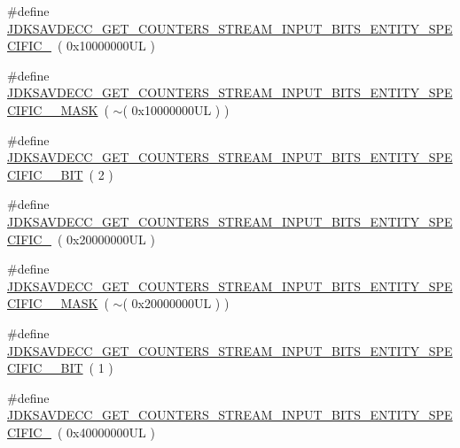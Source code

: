\begin{DoxyCompactItemize}
\item 
\#define \hyperlink{group__get__counters__stream__input__bits_ga68d42da28ac11a7fd256b3d3926f728a}{J\+D\+K\+S\+A\+V\+D\+E\+C\+C\+\_\+\+G\+E\+T\+\_\+\+C\+O\+U\+N\+T\+E\+R\+S\+\_\+\+S\+T\+R\+E\+A\+M\+\_\+\+I\+N\+P\+U\+T\+\_\+\+B\+I\+T\+S\+\_\+\+E\+N\+T\+I\+T\+Y\+\_\+\+S\+P\+E\+C\+I\+F\+I\+C\+\_}~( 0x10000000\+U\+L )
\item 
\#define \hyperlink{group__get__counters__stream__input__bits_gafd41765ad19a55a22f8d0fd66548c28a}{J\+D\+K\+S\+A\+V\+D\+E\+C\+C\+\_\+\+G\+E\+T\+\_\+\+C\+O\+U\+N\+T\+E\+R\+S\+\_\+\+S\+T\+R\+E\+A\+M\+\_\+\+I\+N\+P\+U\+T\+\_\+\+B\+I\+T\+S\+\_\+\+E\+N\+T\+I\+T\+Y\+\_\+\+S\+P\+E\+C\+I\+F\+I\+C\+\_\+\_\+\+M\+A\+SK}~( $\sim$( 0x10000000\+U\+L ) )
\item 
\#define \hyperlink{group__get__counters__stream__input__bits_gaa33fa96737b3830f87c6b1f8ec40be97}{J\+D\+K\+S\+A\+V\+D\+E\+C\+C\+\_\+\+G\+E\+T\+\_\+\+C\+O\+U\+N\+T\+E\+R\+S\+\_\+\+S\+T\+R\+E\+A\+M\+\_\+\+I\+N\+P\+U\+T\+\_\+\+B\+I\+T\+S\+\_\+\+E\+N\+T\+I\+T\+Y\+\_\+\+S\+P\+E\+C\+I\+F\+I\+C\+\_\+\_\+\+B\+IT}~( 2 )
\item 
\#define \hyperlink{group__get__counters__stream__input__bits_ga0891e83444d48357429c7c9b32c61460}{J\+D\+K\+S\+A\+V\+D\+E\+C\+C\+\_\+\+G\+E\+T\+\_\+\+C\+O\+U\+N\+T\+E\+R\+S\+\_\+\+S\+T\+R\+E\+A\+M\+\_\+\+I\+N\+P\+U\+T\+\_\+\+B\+I\+T\+S\+\_\+\+E\+N\+T\+I\+T\+Y\+\_\+\+S\+P\+E\+C\+I\+F\+I\+C\+\_}~( 0x20000000\+U\+L )
\item 
\#define \hyperlink{group__get__counters__stream__input__bits_ga5238c521ad024f330f93c21ce47cf344}{J\+D\+K\+S\+A\+V\+D\+E\+C\+C\+\_\+\+G\+E\+T\+\_\+\+C\+O\+U\+N\+T\+E\+R\+S\+\_\+\+S\+T\+R\+E\+A\+M\+\_\+\+I\+N\+P\+U\+T\+\_\+\+B\+I\+T\+S\+\_\+\+E\+N\+T\+I\+T\+Y\+\_\+\+S\+P\+E\+C\+I\+F\+I\+C\+\_\+\_\+\+M\+A\+SK}~( $\sim$( 0x20000000\+U\+L ) )
\item 
\#define \hyperlink{group__get__counters__stream__input__bits_gac776215970253e9bde2bf05d38b08021}{J\+D\+K\+S\+A\+V\+D\+E\+C\+C\+\_\+\+G\+E\+T\+\_\+\+C\+O\+U\+N\+T\+E\+R\+S\+\_\+\+S\+T\+R\+E\+A\+M\+\_\+\+I\+N\+P\+U\+T\+\_\+\+B\+I\+T\+S\+\_\+\+E\+N\+T\+I\+T\+Y\+\_\+\+S\+P\+E\+C\+I\+F\+I\+C\+\_\+\_\+\+B\+IT}~( 1 )
\item 
\#define \hyperlink{group__get__counters__stream__input__bits_ga91637c250c21884f1b28794741e062b2}{J\+D\+K\+S\+A\+V\+D\+E\+C\+C\+\_\+\+G\+E\+T\+\_\+\+C\+O\+U\+N\+T\+E\+R\+S\+\_\+\+S\+T\+R\+E\+A\+M\+\_\+\+I\+N\+P\+U\+T\+\_\+\+B\+I\+T\+S\+\_\+\+E\+N\+T\+I\+T\+Y\+\_\+\+S\+P\+E\+C\+I\+F\+I\+C\+\_}~( 0x40000000\+U\+L )

\end{DoxyCompactItemize}

